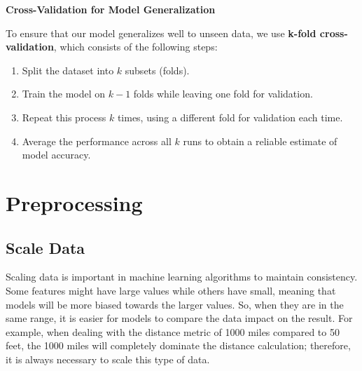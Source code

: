\begin{center}
\end{center}


\textbf{Cross-Validation for Model Generalization}

To ensure that our model generalizes well to unseen data, we use \textbf{k-fold cross-validation}, which consists of the following steps:

\begin{enumerate}
    \item Split the dataset into \( k \) subsets (folds).
    \item Train the model on \( k-1 \) folds while leaving one fold for validation.
    \item Repeat this process \( k \) times, using a different fold for validation each time.
    \item Average the performance across all \( k \) runs to obtain a reliable estimate of model accuracy.
\end{enumerate}


\section{Preprocessing} 

\subsection{Scale Data}
Scaling data is important in machine learning algorithms to maintain consistency.
Some features might have large values while others have small, meaning that models will
be more biased towards the larger values. So, when they are in the same range, it is easier for
models to compare the data impact on the result. For example, when dealing with the distance metric of 
1000 miles compared to 50 feet, the 1000 miles will completely dominate the distance calculation; therefore, it
is always necessary to scale this type of data.

